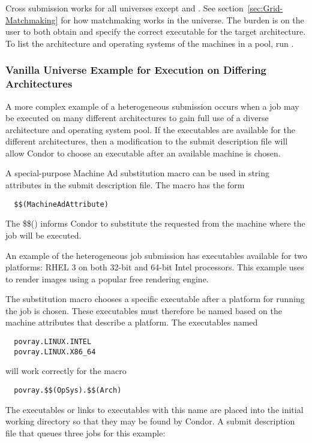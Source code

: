 Cross submission works for all universes except  and
.
See section~\ref{sec:Grid-Matchmaking} for how matchmaking works in the
 universe.
The burden is on the user to both obtain and specify
the correct executable for the target architecture.
To list the architecture and operating systems of the machines
in a pool, run .

\subsubsection{Vanilla Universe Example for Execution on Differing Architectures} 

A more complex example of a heterogeneous submission
occurs when a job may be executed on
many different architectures to gain full
use of a diverse architecture and operating system pool.
If the executables are available for the different architectures,
then a modification to the submit description file
will allow Condor to choose an executable after an
available machine is chosen.

A special-purpose Machine Ad substitution macro can be used in
string
attributes in the submit description file.
The macro has the form
\begin{verbatim}
  $$(MachineAdAttribute)
\end{verbatim}
The \$\$() informs Condor to substitute the requested 
from the machine where the job will be executed.

An example of the heterogeneous job submission
has executables available for two platforms:
RHEL 3 on both 32-bit and 64-bit Intel processors.
This example uses 
to render images using a popular free rendering engine.

The substitution macro chooses a specific executable after
a platform for running the job is chosen.
These executables must therefore be named based on the
machine attributes that describe a platform.
The executables named \begin{verbatim}
  povray.LINUX.INTEL
  povray.LINUX.X86_64
\end{verbatim}
will work correctly for the macro
\begin{verbatim}
  povray.$$(OpSys).$$(Arch)
\end{verbatim}

The executables or links to executables with this name
are placed into the initial working directory so that they may be
found by Condor. 
A submit description file that queues three jobs for this example:

